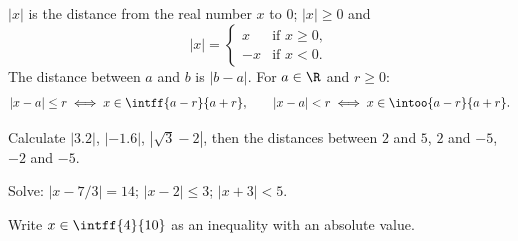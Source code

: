 \begin{keypoint}
$|x|$ is the distance from the real number $x$ to $0$; $|x|\geq0$ and
\[|x|=\begin{cases}x&\text{if }x\geq0,\\-x&\text{if }x<0.\end{cases}\]
The distance between $a$ and $b$ is $|b-a|$. For $a\in\R$ and $r\geq0$:
\[|x-a|\leq r\iff x\in\intff{a-r}{a+r},\qquad |x-a|<r\iff x\in\intoo{a-r}{a+r}.\]
\end{keypoint}
\begin{example}Calculate $|\num{3,2}|$, $|-\num{1,6}|$, $|\sqrt3-2|$, then the distances between $2$ and $5$, $2$ and $-5$, $-2$ and $-5$.\end{example}
\begin{example}Solve: $|x-7/3|=14$; $|x-2|\leq3$; $|x+3|<5$.\end{example}
\begin{example}Write $x\in\intff{4}{10}$ as an inequality with an absolute value.\end{example}

